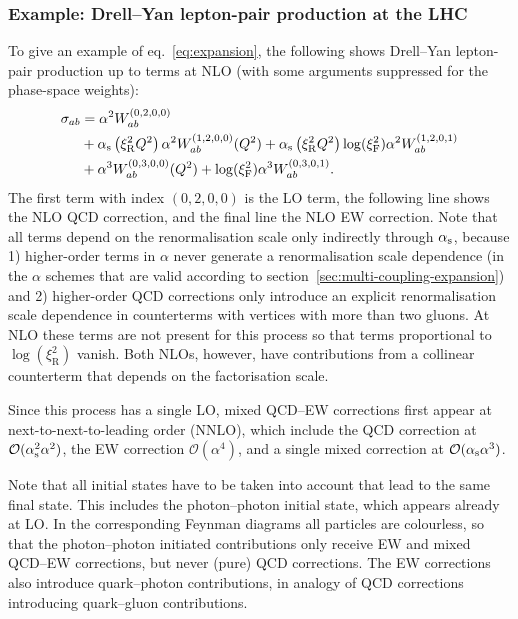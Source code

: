 \subsubsection{Example: Drell--Yan lepton-pair production at the LHC}
\label{sec:pineappl-example}

To give an example of eq.~\eqref{eq:expansion}, the following shows Drell--Yan lepton-pair production up to terms at NLO (with some arguments suppressed for the phase-space weights):
\begin{equation}
\begin{split}
\sigma_{ab}
    &= \alpha^2 W_{ab}^{(0,2,0,0)} \\
    &+ \alpha_\mathrm{s} \left( \xi_\mathrm{R}^2 Q^2 \right) \alpha^2 W_{ab}^{(1,2,0,0)} (Q^2) + \alpha_\mathrm{s} \left( \xi_\mathrm{R}^2 Q^2 \right) \log (\xi_\mathrm{F}^2) \alpha^2 W_{ab}^{(1,2,0,1)} \\
    &+ \alpha^3 W_{ab}^{(0,3,0,0)} (Q^2) + \log (\xi_\mathrm{F}^2) \alpha^3 W_{ab}^{(0,3,0,1)} \text{.}
\end{split}
\end{equation}
The first term with index $(0,2,0,0)$ is the LO term, the following line shows the NLO QCD correction, and the final line the NLO EW correction.
Note that all terms depend on the renormalisation scale only indirectly through $\alpha_\mathrm{s}$, because 1) higher-order terms in $\alpha$ never generate a renormalisation scale dependence (in the $\alpha$ schemes that are valid according to section~\ref{sec:multi-coupling-expansion}) and 2) higher-order QCD corrections only introduce an explicit renormalisation scale dependence in counterterms with vertices with more than two gluons.
At NLO these terms are not present for this process so that terms proportional to $\log (\xi_\mathrm{R}^2)$ vanish.
Both NLOs, however, have contributions from a collinear counterterm that depends on the factorisation scale.

Since this process has a single LO, mixed QCD--EW corrections first appear at next-to-next-to-leading order (NNLO), which include the QCD correction at $\mathcal{O} (\alpha_\mathrm{s}^2 \alpha^2)$, the EW correction $\mathcal{O} (\alpha^4)$, and a single mixed correction at $\mathcal{O} (\alpha_\mathrm{s} \alpha^3)$.

Note that all initial states have to be taken into account that lead to the same final state.
This includes the photon--photon initial state, which appears already at LO.
In the corresponding Feynman diagrams all particles are colourless, so that the photon--photon initiated contributions only receive EW and mixed QCD--EW corrections, but never (pure) QCD corrections.
The EW corrections also introduce quark--photon contributions, in analogy of QCD corrections introducing quark--gluon contributions.

